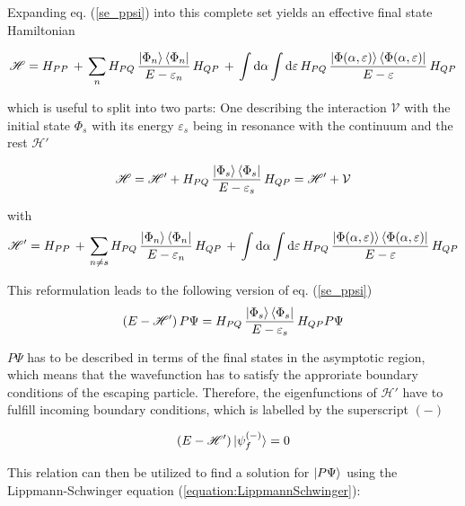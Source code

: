 Expanding eq. (\ref{se_ppsi}) into this complete set yields an effective
final state Hamiltonian

\begin{equation}
  \mathscr{H} = H_{PP}\, + \,
  \sum\limits_n H_{PQ} \,\frac{\ket{\Phi_n}\bra{\Phi_n}}{E-\varepsilon_n}\, H_{QP} \,+\,
  \int \mathrm{d}\alpha \int\mathrm{d}\varepsilon \,H_{PQ} \,
  \frac{\ket{\Phi(\alpha,\varepsilon)}\bra{\Phi(\alpha,\varepsilon)}}{E-\varepsilon} \, H_{QP}
\end{equation}

which is useful to split into two parts: One describing the interaction
$\mathcal{V}$ with the
initial state $\Phi_s$ with its energy $\varepsilon_s$ being in resonance with
the continuum and the rest $\mathscr{H}'$

\begin{equation}
  \mathscr{H} = \mathscr{H}' +
                H_{PQ} \,\frac{\ket{\Phi_s}\bra{\Phi_s}}{E-\varepsilon_s}\, H_{QP}
              = \mathscr{H}' + \mathcal{V}
\end{equation}

with
\begin{equation}
  \mathscr{H}' = H_{PP}\, + \,
  \sum\limits_{n\ne s} H_{PQ} \,\frac{\ket{\Phi_n}\bra{\Phi_n}}{E-\varepsilon_n}
  \, H_{QP} \,+\,
  \int \mathrm{d}\alpha \int\mathrm{d}\varepsilon \,H_{PQ} \,
  \frac{\ket{\Phi(\alpha,\varepsilon)}\bra{\Phi(\alpha,\varepsilon)}}{E-\varepsilon} \, H_{QP}
\end{equation}

This reformulation leads to the following version of eq. (\ref{se_ppsi})
\begin{equation}
  (E - \mathscr{H}')\, P \Psi =
   H_{PQ} \,\frac{\ket{\Phi_s}\bra{\Phi_s}}{E-\varepsilon_s}\, H_{QP} P \Psi %
\end{equation}

$P \Psi$ has to be described in terms of the final states in the asymptotic
region, which means that the wavefunction has to satisfy the approriate
boundary conditions of the escaping particle. Therefore,
the eigenfunctions of $\mathscr{H}'$ have to fulfill incoming boundary conditions,
which is labelled by the superscript $(-)$

\begin{equation}
  (E-\mathscr{H}') \ket{\psi_f^{(-)}} = 0 \label{sol_outg}
\end{equation}

This relation can then be utilized to find a solution for $\ket{P \Psi}$
using the Lippmann-Schwinger equation (\ref{equation:LippmannSchwinger}):

